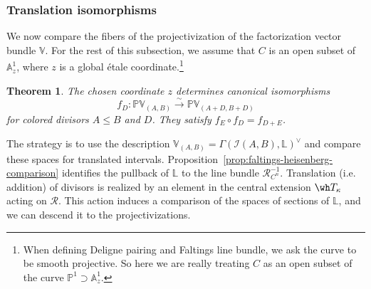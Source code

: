 \documentclass{amsart}
\numberwithin{equation}{section}
\numberwithin{figure}{section}
\newtheorem{thm}{Theorem}[section]
\theoremstyle{definition}
\theoremstyle{remark}
\renewcommand{\c}[1]{\mathcal{#1}}
\renewcommand{\b}[1]{\mathbb{#1}}
\begin{document}
\subsubsection{Translation isomorphisms}
We now compare the fibers of the projectivization of the factorization vector bundle $\b V$. For the rest of this subsection, we assume that $C$ is an open subset of $\b A^1_z$, where $z$ is a global \'etale coordinate.\footnote{When defining Deligne pairing and Faltings line bundle, we ask the curve to be smooth projective.
So here we are really treating $C$ as an open subset of the curve $\b P^1\supset \b A^1_z$.\label{footnote}}

\begin{thm}
	\label{thm:interval-translation}
	The chosen coordinate $z$ determines canonical
	isomorphisms
	\[
	f_D:\b P\b V_{(A,B)}
	\xrightarrow{\sim}
	\b P\b V_{(A+D,B+D)}
	\]
	for colored divisors $A\leq B$ and $D$.
	 They satisfy
	$f_E\circ f_D=f_{D+E}$.
\end{thm}

The strategy is to use the description
$\b V_{(A,B)}=\Gamma(\c I(A,B),\b L)^\vee$
and compare these spaces for translated intervals.
Proposition~\ref{prop:faltings-heisenberg-comparison}
identifies the pullback of $\b L$ to the
line bundle $\c R^{-1}_{C^n}$.
Translation (i.e. addition) of divisors is realized by an element in the central extension $\wh T_\kappa$ acting on $\c R$.
This action induces a comparison of the spaces of
sections of $\b L$, and we can descend it to the projectivizations.
\end{document}
